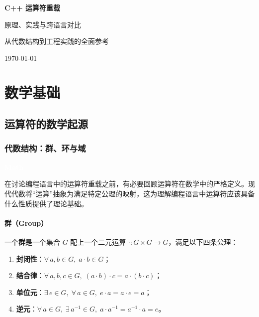 \documentclass[12pt,a4paper,fontset=fandol]{ctexbook}
\newcommand{\mathlabel}{%
  \noindent\begin{tcolorbox}[sharp corners,colback=mathheadbg,colframe=mathheadbg,
    left=6pt,right=6pt,top=2pt,bottom=2pt,boxrule=0pt]
  \textcolor{white}{\small\bfseries\sffamily Math}\end{tcolorbox}%
}
\begin{document}
\frontmatter

\begin{titlepage}
\centering
\vspace*{4cm}
{\Huge\bfseries C++ 运算符重载\par}
\vspace{1cm}
{\LARGE 原理、实践与跨语言对比\par}
\vspace{0.5cm}
{\large 从代数结构到工程实践的全面参考\par}
\vfill
{\large \today\par}
\end{titlepage}

\tableofcontents

\mainmatter

\part{数学基础}

\chapter{运算符的数学起源}

\section{代数结构：群、环与域}

\mathlabel

在讨论编程语言中的运算符重载之前，有必要回顾运算符在数学中的严格定义。现代代数将``运算''抽象为满足特定公理的映射，这为理解编程语言中运算符应该具备什么性质提供了理论基础。

\subsection{群（Group）}

一个\textbf{群}是一个集合 $G$ 配上一个二元运算 $\cdot : G \times G \to G$，满足以下四条公理：

\begin{enumerate}
  \item \textbf{封闭性}：$\forall\, a, b \in G,\; a \cdot b \in G$；
  \item \textbf{结合律}：$\forall\, a, b, c \in G,\; (a \cdot b) \cdot c = a \cdot (b \cdot c)$；
  \item \textbf{单位元}：$\exists\, e \in G,\; \forall\, a \in G,\; e \cdot a = a \cdot e = a$；
  \item \textbf{逆元}：$\forall\, a \in G,\; \exists\, a^{-1} \in G,\; a \cdot a^{-1} = a^{-1} \cdot a = e$。
\end{enumerate}
\end{document}
